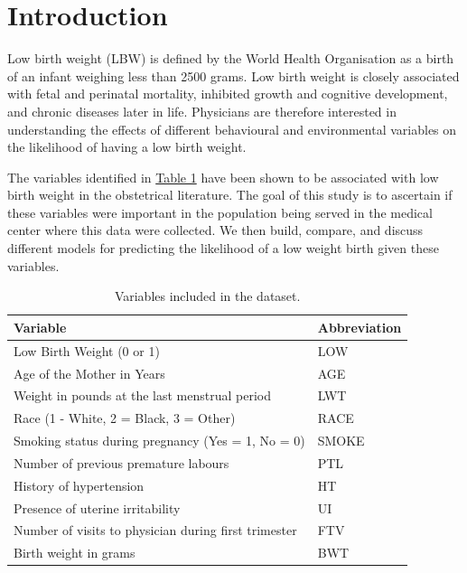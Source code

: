 \newpage

\section{Introduction}
Low birth weight (LBW) is defined by the World Health Organisation as a birth of an infant weighing less than 2500 grams. Low birth weight is closely associated with fetal and perinatal mortality, inhibited growth and cognitive development, and chronic diseases later in life. Physicians are therefore interested in understanding the effects of different behavioural and environmental variables on the likelihood of having a low birth weight.

The variables identified in \hyperlink{tab:variables}{Table 1} have been shown to be associated with low birth weight in the obstetrical literature. The goal of this study is to ascertain if these variables were important in the population being served in the medical center where this data were collected. We then build, compare, and discuss different models for predicting the likelihood of a low weight birth given these variables. 

\vspace{0.5cm}
\renewcommand{\arraystretch}{1.5}
\begin{table}[ht]
    \centering
    \begin{tabular}{ l|l } 
     \hline \hline
      \textbf{Variable} & \textbf{Abbreviation} \\
      \hline
     Low Birth Weight (0 or 1) & LOW \\
     \hline
     Age of the Mother in Years & AGE \\
     \hline
     Weight in pounds at the last menstrual period & LWT \\
     \hline
     Race (1 - White, 2 = Black, 3 = Other) & RACE \\
     \hline
     Smoking status during pregnancy (Yes = 1, No = 0) & SMOKE \\
     \hline
     Number of previous premature labours & PTL \\
     \hline
     History of hypertension & HT \\
     \hline
     Presence of uterine irritability & UI \\
     \hline
     Number of visits to physician during first trimester & FTV \\
     \hline
     Birth weight in grams & BWT \\
     \hline \hline
    \end{tabular}
    \caption{Variables included in the dataset.}
    \label{tab:variables}
\end{table}
\vspace{0.5cm}

